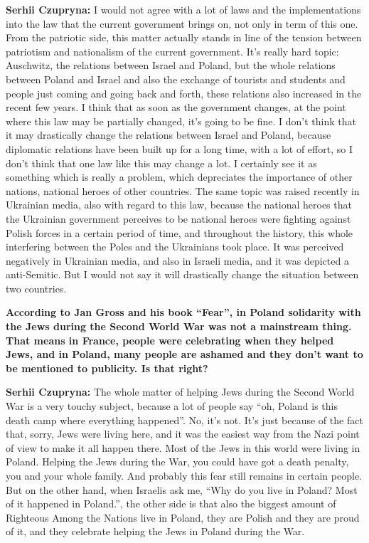 \textbf{Serhii Czupryna:} I would not agree with a lot of laws and the implementations into the law that the current government brings on, not only in term of this one. From the patriotic side, this matter actually stands in line of the tension between patriotism and nationalism of the current government. It’s really hard topic: Auschwitz, the relations between Israel and Poland, but the whole relations between Poland and Israel and also the exchange of tourists and students and people just coming and going back and forth, these relations also increased in the recent few years. I think that as soon as the government changes, at the point where this law may be partially changed, it’s going to be fine. I don’t think that it may drastically change the relations between Israel and Poland, because diplomatic relations have been built up for a long time, with a lot of effort, so I don’t think that one law like this may change a lot. I certainly see it as something which is really a problem, which depreciates the importance of other nations, national heroes of other countries. The same topic was raised recently in Ukrainian media, also with regard to this law, because the national heroes that the Ukrainian government perceives to be national heroes were fighting against Polish forces in a certain period of time, and throughout the history, this whole interfering between the Poles and the Ukrainians took place. It was perceived negatively in Ukrainian media, and also in Israeli media, and it was depicted a anti-Semitic. But I would not say it will drastically change the situation between two countries.\par
\textbf{According to Jan Gross and his book ``Fear'', in Poland solidarity with the Jews during the Second World War was not a mainstream thing. That means in France, people were celebrating when they helped Jews, and in Poland, many people are ashamed and they don’t want to be mentioned to publicity. Is that right?}\par
\textbf{Serhii Czupryna:} The whole matter of helping Jews during the Second World War is a very touchy subject, because a lot of people say ``oh, Poland is this death camp where everything happened''. No, it’s not. It’s just because of the fact that, sorry, Jews were living here, and it was the easiest way from the Nazi point of view to make it all happen there. Most of the Jews in this world were living in Poland. Helping the Jews during the War, you could have got a death penalty, you and your whole family. And probably this fear still remains in certain people. But on the other hand, when Israelis ask me, ``Why do you live in Poland? Most of it happened in Poland.'', the other side is that also the biggest amount of Righteous Among the Nations live in Poland, they are Polish and they are proud of it, and they celebrate helping the Jews in Poland during the War.\par
